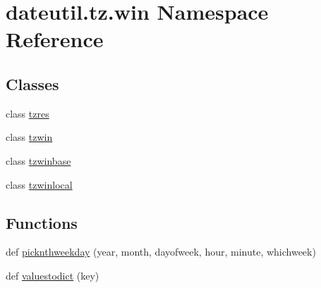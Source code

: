 \hypertarget{namespacedateutil_1_1tz_1_1win}{}\section{dateutil.\+tz.\+win Namespace Reference}
\label{namespacedateutil_1_1tz_1_1win}
\subsection*{Classes}
\begin{DoxyCompactItemize}
\item 
class \hyperlink{classdateutil_1_1tz_1_1win_1_1tzres}{tzres}
\item 
class \hyperlink{classdateutil_1_1tz_1_1win_1_1tzwin}{tzwin}
\item 
class \hyperlink{classdateutil_1_1tz_1_1win_1_1tzwinbase}{tzwinbase}
\item 
class \hyperlink{classdateutil_1_1tz_1_1win_1_1tzwinlocal}{tzwinlocal}
\end{DoxyCompactItemize}
\subsection*{Functions}
\begin{DoxyCompactItemize}
\item 
def \hyperlink{namespacedateutil_1_1tz_1_1win_abdff496f85b6c17802caf7217e1c6a99}{picknthweekday} (year, month, dayofweek, hour, minute, whichweek)
\item 
def \hyperlink{namespacedateutil_1_1tz_1_1win_ae1ad679865b6f4c022ff3a3069401067}{valuestodict} (key)
\end{DoxyCompactItemize}
